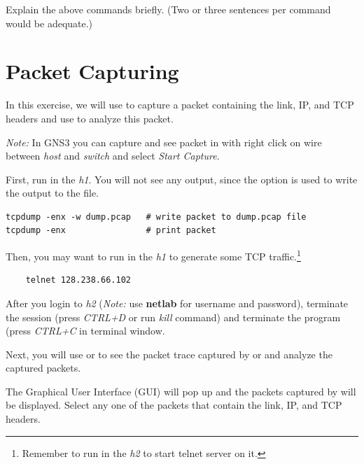\documentclass{../UTNetLab}
\begin{document}
\begin{report}
    \item Explain the above commands briefly.
    (Two or three sentences per command would be adequate.)
\end{report}

\section{Packet Capturing}
In this exercise, we will use  to capture a packet containing the link, IP, and TCP headers and use  to analyze this packet.

\textit{Note:} In GNS3 you can capture and see packet in  with right click on wire between \textit{host} and \textit{switch} and select \textit{Start Capture}.

First, run  in the \textit{h1}.
You will not see any  output, since the  option is used to write the output to the  file.

\begin{lstlisting}[emph={dump,pcap}]
tcpdump -enx -w dump.pcap   # write packet to dump.pcap file
tcpdump -enx                # print packet
\end{lstlisting}

Then, you may want to run  in the \textit{h1} to generate some TCP traffic.\footnote{Remember to run  in the \textit{h2} to start telnet server on it.}

\begin{lstlisting}
	telnet 128.238.66.102
\end{lstlisting}

After you login to \textit{h2} (\textit{Note:} use \textbf{netlab} for username and password), terminate the  session (press \textit{CTRL+D} or run \textit{kill} command) and terminate the  program (press \textit{CTRL+C} in  terminal window.


Next, you will use  or  to see the packet trace captured by  or  and analyze the captured packets.

The  Graphical User Interface (GUI) will pop up and the packets captured by  will be displayed.
Select any one of the packets that contain the link, IP, and TCP headers.
\end{document}
